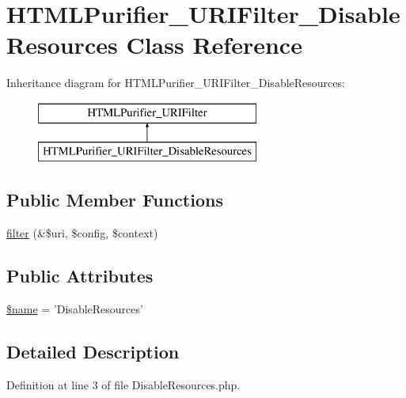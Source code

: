 \hypertarget{classHTMLPurifier__URIFilter__DisableResources}{\section{H\+T\+M\+L\+Purifier\+\_\+\+U\+R\+I\+Filter\+\_\+\+Disable\+Resources Class Reference}
\label{classHTMLPurifier__URIFilter__DisableResources}
}
Inheritance diagram for H\+T\+M\+L\+Purifier\+\_\+\+U\+R\+I\+Filter\+\_\+\+Disable\+Resources\+:\begin{figure}[H]
\begin{center}
\leavevmode
\includegraphics[height=2.000000cm]{classHTMLPurifier__URIFilter__DisableResources}
\end{center}
\end{figure}
\subsection*{Public Member Functions}
\begin{DoxyCompactItemize}
\item 
\hyperlink{classHTMLPurifier__URIFilter__DisableResources_a4ba4dbe676509abbe5c92a403afe4d1e}{filter} (\&\$uri, \$config, \$context)
\end{DoxyCompactItemize}
\subsection*{Public Attributes}
\begin{DoxyCompactItemize}
\item 
\hyperlink{classHTMLPurifier__URIFilter__DisableResources_a32a025c93830816e4287da6c3648e002}{\$name} = 'Disable\+Resources'
\end{DoxyCompactItemize}


\subsection{Detailed Description}


Definition at line 3 of file Disable\+Resources.\+php.



